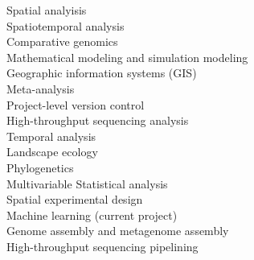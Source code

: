 \documentclass{article}
\begin{document}
  \begin{adjustwidth}{2mm}{}\begin{multicols}{2}
    Spatial analyisis \cite{Darcy2018a,Darcy2011a,Darcy640029}\\
    Spatiotemporal analysis \cite{Darcy640029,Darcy2017,Nemergut2016}\\
    Comparative genomics \cite{Darcy2018,Lynch2014}\\
    Mathematical modeling and simulation modeling \cite{Darcy685644,Darcy640029, Darcy2016}\\
    Geographic information systems (GIS) \cite{Darcy640029,Darcy2018a,Darcy2017}\\
    Meta-analysis \cite{Darcy685644,Darcy2018a,Darcy2011a}\\
    Project-level version control \cite[\href{https://github.com/darcyj/specificity}{specificity} R package]{Darcy2018}\\
    High-throughput sequencing analysis \cite{Darcy685644,Darcy640029,Darcy2018a}\\

    Temporal analysis \cite{Darcy685644,Knelman2014,Kennedy2016}\\
    Landscape ecology \cite{Darcy640029,Darcy2018,Darcy2017}\\
    Phylogenetics \cite{Darcy2011a,Schmidt2015a,Naff2013}\\
    Multivariable Statistical analysis \cite{Darcy640029,Darcy2017,Gendron2019}\\
    Spatial experimental design \cite{Darcy2018a,Darcy2017,Darcy2018}\\
    Machine learning (current project)\\
    Genome assembly and metagenome assembly \cite{Darcy2018,Lynch2014}\\
    High-throughput sequencing pipelining \cite{Darcy685644,Darcy640029,Darcy2018a}

  \end{multicols}\end{adjustwidth}
\end{document}
